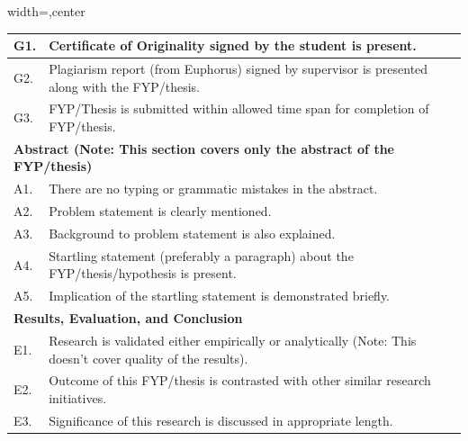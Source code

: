 \begin{table}[!ht]
\begin{adjustbox}{width=\linewidth,center}
\begin{tabular}{p{0.6cm}p{9cm}p{0.6cm}}
\multicolumn{1}{|l|}{G1.} & \multicolumn{1}{l|}{Certificate of Originality signed by   the student is present.}                                                  & \multicolumn{1}{l|}{} \\ \midrule
\multicolumn{1}{|l|}{G2.} & \multicolumn{1}{l|}{Plagiarism   report (from Euphorus) signed by supervisor is presented along with the   FYP/thesis.}                  & \multicolumn{1}{l|}{} \\ \midrule
\multicolumn{1}{|l|}{G3.} & \multicolumn{1}{l|}{FYP/Thesis is submitted   within allowed time span for completion of FYP/thesis.}                                        & \multicolumn{1}{l|}{} \\ \midrule
\multicolumn{3}{|l|}{\textbf{Abstract (Note:   This section covers only the abstract of the FYP/thesis)}}                                                                                    \\ \midrule
\multicolumn{1}{|l|}{A1.} & \multicolumn{1}{l|}{There are no typing or grammatic   mistakes in the abstract.}                                                    & \multicolumn{1}{l|}{} \\ \midrule
\multicolumn{1}{|l|}{A2.} & \multicolumn{1}{l|}{Problem statement is   clearly mentioned.}                                                                       & \multicolumn{1}{l|}{} \\ \midrule
\multicolumn{1}{|l|}{A3.} & \multicolumn{1}{l|}{Background to problem   statement is also explained.}                                                            & \multicolumn{1}{l|}{} \\ \midrule
\multicolumn{1}{|l|}{A4.} & \multicolumn{1}{l|}{Startling statement   (preferably a paragraph) about the FYP/thesis/hypothesis is present.}                          & \multicolumn{1}{l|}{} \\ \midrule
\multicolumn{1}{|l|}{A5.} & \multicolumn{1}{l|}{Implication of the   startling statement is demonstrated briefly.}                                               & \multicolumn{1}{l|}{} \\ \midrule
\multicolumn{3}{|l|}{\textbf{Results, Evaluation, and Conclusion}}                                                                                                                       \\ \midrule
\multicolumn{1}{|l|}{E1.} & \multicolumn{1}{l|}{Research is   validated either empirically or analytically (Note: This doesn’t cover   quality of the results).} & \multicolumn{1}{l|}{} \\ \midrule
\multicolumn{1}{|l|}{E2.} & \multicolumn{1}{l|}{Outcome of this   FYP/thesis is contrasted with other similar research initiatives.}                                 & \multicolumn{1}{l|}{} \\ \midrule
\multicolumn{1}{|l|}{E3.} & \multicolumn{1}{l|}{Significance of this   research is discussed in appropriate length.} \\ \midrule
\end{tabular}
\end{adjustbox}
\end{table}